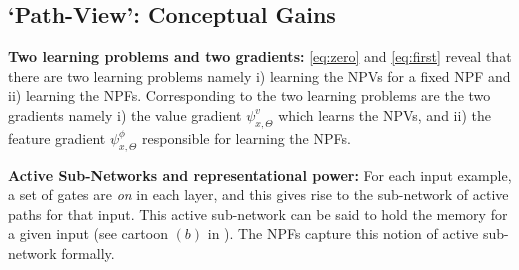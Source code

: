 \subsection{`Path-View': Conceptual Gains}\label{sec:cg}
\textbf{Two learning problems and two gradients:} \eqref{eq:zero} and \eqref{eq:first} reveal that there are two learning problems namely i) learning the NPVs for a fixed NPF and ii) learning the NPFs. Corresponding to the two learning problems are the two gradients namely i) the value gradient $\psi^v_{x,\Theta}$ which learns the NPVs, and ii) the feature gradient $\psi^{\phi}_{x,\Theta}$ responsible for learning the NPFs. 

\textbf{Active Sub-Networks and representational power:} For each input example, a set of gates are \emph{on} in each layer, and this gives rise to the sub-network of active paths for that input. This active sub-network can be said to hold the memory for a given input (see cartoon $(b)$ in ). The NPFs capture this notion of active sub-network formally.

